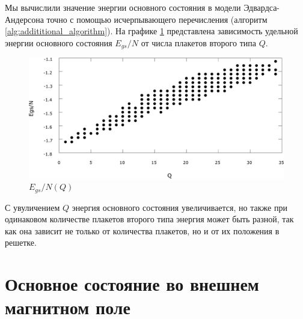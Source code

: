 \documentclass[utf8, babel, sor, jor, amsmath, amssymb, reprint]{elsarticle} %
\begin{document}
Мы вычислили значение энергии основного состояния в модели Эдвардса-Андерсона точно с помощью исчерпывающего перечисления (алгоритм \ref{alg:addititional_algorithm}). На графике \ref{fig:E(Q)} представлена зависимость удельной энергии основного состояния $E_{gs}/N$ от числа плакетов второго типа $Q$. 


\begin{figure}[H]
	\centering
		\includegraphics[width=0.9\linewidth]{pictures/E_Q.eps}
	\caption{$E_{gs}/N(Q)$}
	\label{fig:E(Q)}
\end{figure}

С увуличением $Q$ энергия основного состояния увеличивается, но также при одинаковом количестве плакетов второго типа энергия может быть разной, так как она зависит не только от количества плакетов, но и от их положения в решетке.

\section{Основное состояние во внешнем магнитном поле}
\end{document}
